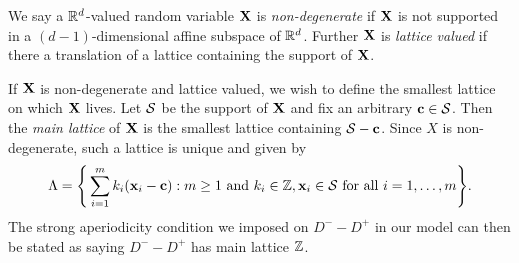 We say a ${\mathbb R}^d$-valued random variable ${\mathbf X}$ is \emph{non-degenerate} if ${\mathbf X}$ is not supported in a $(d-1)$-dimensional affine subspace of ${\mathbb R}^d$. Further ${\mathbf X}$ is \emph{lattice valued} if there a translation of a lattice containing the support of ${\mathbf X}$.

If ${\mathbf X}$ is non-degenerate and lattice valued, we wish to define the smallest lattice on which ${\mathbf X}$ lives. Let ${\mathcal S}$ be the support of ${\mathbf X}$ and fix an arbitrary ${\mathbf c} \in {\mathcal S}$. Then the \emph{main lattice} of ${\mathbf X}$ is the smallest lattice containing ${\mathcal S} - {\mathbf c}$. Since $X$ is non-degenerate, such a lattice is unique and given by 
\begin{equation*}
    \Lambda = \Bigg\{
        \sum_{i=1}^m k_i ({\mathbf x}_i - {\mathbf c}) :
        \text{$m \geq 1$ and $k_i \in {\mathbb Z}, {\mathbf x}_i \in {\mathcal S}$ for all $i = 1, \ldots, m$}
    \Bigg\}.
\end{equation*}
The strong aperiodicity condition we imposed on $D^- - D^+$ in our model can then be stated as saying $D^- - D^+$ has main lattice ${\mathbb Z}$.

